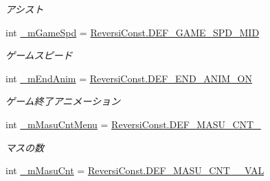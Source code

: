\begin{DoxyCompactItemize}
\begin{DoxyCompactList}\small\item\em アシスト \end{DoxyCompactList}\item 
\mbox{\label{class_reversi_wpf_1_1_reversi_setting_a4762d1e48369323087c3344dee1465bc}} 
int \hyperlink{class_reversi_wpf_1_1_reversi_setting_a4762d1e48369323087c3344dee1465bc}{\+\_\+m\+Game\+Spd} = \hyperlink{class_reversi_wpf_1_1_reversi_const_aeca7301a662df9675f1eb85b5e5b010b}{Reversi\+Const.\+D\+E\+F\+\_\+\+G\+A\+M\+E\+\_\+\+S\+P\+D\+\_\+\+M\+ID}
\begin{DoxyCompactList}\small\item\em ゲームスピード \end{DoxyCompactList}\item 
\mbox{\label{class_reversi_wpf_1_1_reversi_setting_a9014a506b56bd655dbe30a04ff2ded87}} 
int \hyperlink{class_reversi_wpf_1_1_reversi_setting_a9014a506b56bd655dbe30a04ff2ded87}{\+\_\+m\+End\+Anim} = \hyperlink{class_reversi_wpf_1_1_reversi_const_add7ae243871d8ed655d4fcabb9fb747f}{Reversi\+Const.\+D\+E\+F\+\_\+\+E\+N\+D\+\_\+\+A\+N\+I\+M\+\_\+\+ON}
\begin{DoxyCompactList}\small\item\em ゲーム終了アニメーション \end{DoxyCompactList}\item 
\mbox{\label{class_reversi_wpf_1_1_reversi_setting_a3fa64f081f1065ecafe1ae2da811ca11}} 
int \hyperlink{class_reversi_wpf_1_1_reversi_setting_a3fa64f081f1065ecafe1ae2da811ca11}{\+\_\+m\+Masu\+Cnt\+Menu} = \hyperlink{class_reversi_wpf_1_1_reversi_const_a7b82d91dd1c69088168a33ad39329a40}{Reversi\+Const.\+D\+E\+F\+\_\+\+M\+A\+S\+U\+\_\+\+C\+N\+T\+\_}
\begin{DoxyCompactList}\small\item\em マスの数 \end{DoxyCompactList}\item 
\mbox{\label{class_reversi_wpf_1_1_reversi_setting_a915f2f08e59be81347d8e7e751910352}} 
int \hyperlink{class_reversi_wpf_1_1_reversi_setting_a915f2f08e59be81347d8e7e751910352}{\+\_\+m\+Masu\+Cnt} = \hyperlink{class_reversi_wpf_1_1_reversi_const_a3ff7c0f6c0aa83a8b27f560c874bbf65}{Reversi\+Const.\+D\+E\+F\+\_\+\+M\+A\+S\+U\+\_\+\+C\+N\+T\+\_\+\_\+\+V\+AL}

\end{DoxyCompactItemize}
